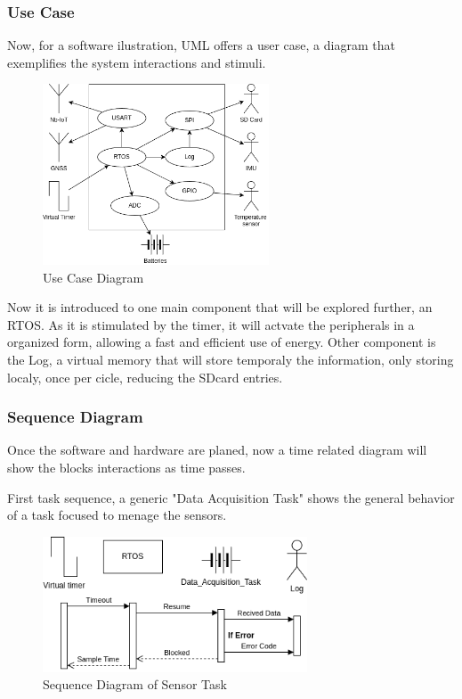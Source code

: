 \subsubsection{Use Case}

Now, for a software ilustration, UML offers a user case, a diagram that exemplifies the system interactions and stimuli.

\begin{figure}[H]
    \centering
    \includegraphics[width=0.6\textwidth]{images/diagrams/use_case/Use Case.drawio.png}  %
    \caption{Use Case Diagram}
    \label{fig:Use Case Diagram}        
\end{figure}

Now it is introduced to one main component that will be explored further, an RTOS. As it is stimulated by the timer, it will actvate the 
peripherals in a organized form, allowing a fast and efficient use of energy. Other component is the Log, a virtual memory that will store
temporaly the information, only storing localy, once per cicle, reducing the SDcard entries.

\subsubsection{Sequence Diagram}

Once the software and hardware are planed, now a time related diagram will show the blocks interactions
as time passes.

First task sequence, a generic "Data Acquisition Task" shows the general behavior of a task focused to menage the sensors.

\begin{figure}[H]
    \centering
    \includegraphics[width=0.7\textwidth]{images/diagrams/sequence_diagram/sequence_diagram_1/Sequence Diagram.drawio.png}  %
    \caption{Sequence Diagram of Sensor Task}
    \label{fig:Sequence Diagram of Sensor Task}
\end{figure}

